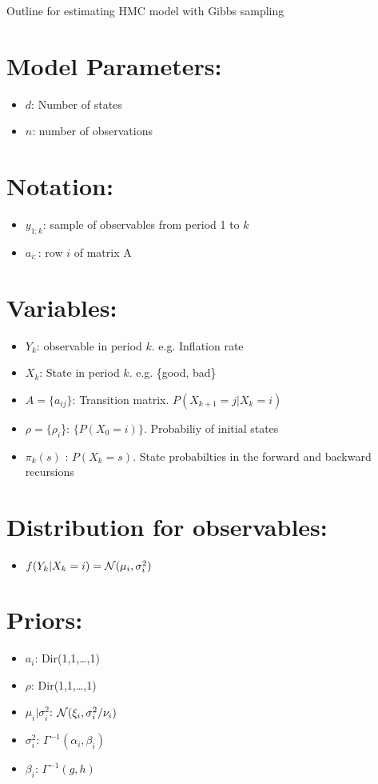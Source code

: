 \documentclass[12pt]{article}
\begin{document}
Outline for estimating HMC model with Gibbs sampling

\section*{Model Parameters:}
\begin{itemize}
  \item $d$: Number of states
  \item $n$: number of observations
\end{itemize}
 
\section*{Notation:}
\begin{itemize} 
  \item $y_{1:k}$: sample of observables from period 1 to $k$
  \item $a_{i:}$: row $i$ of matrix A
\end{itemize}

\section*{Variables:}
\begin{itemize} 
  \item $Y_k$: observable in period $k$. e.g. Inflation rate
  \item $X_k$: State in period $k$. e.g. \{good, bad\}
  \item $A=\{a_{ij}\}$: Transition matrix. $P(X_{k+1} = j|X_{k} = i)$ 
  \item $\rho = \{\rho_i$\}: $\{P(X_0 = i)\}$. Probabiliy of initial states 
  \item $\pi_{k}(s)$ : $P(X_k = s )$. State probabilties in the forward and backward recursions
\end{itemize}

\section*{Distribution for observables:}
\begin{itemize}
  \item $f(Y_k|X_k=i) = \operatorname{\mathcal{N}}(\mu_i, \sigma^2_i)$
\end{itemize}
 

\section*{Priors:}
\begin{itemize}
  \item $a_i$: Dir(1,1,\ldots,1)
  \item $\rho$: Dir(1,1,\ldots,1)
  \item $\mu_i| \sigma_i^2$: $\operatorname{\mathcal{N}}(\xi_i,\sigma_i^2/\nu_i)$
  \item $\sigma_i^{2}$: $\Gamma^{-1}(\alpha_i,\beta_i)$
  \item $\beta_i$: $\Gamma^{-1}(g,h)$
\end{itemize}
\end{document}
